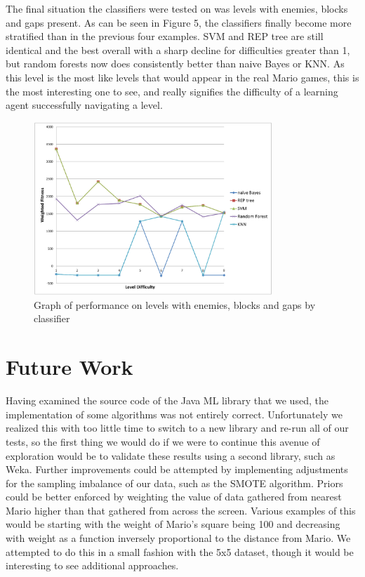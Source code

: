 \documentclass[]{article}   %
\begin{document}
The final situation the classifiers were tested on was levels with enemies, blocks and gaps present. As can be seen in Figure 5, the classifiers finally become 
more stratified than in the previous four examples. SVM and REP tree are still identical and the best overall with a sharp decline for difficulties greater than 1, but 
random forests now does consistently better than naive Bayes or KNN. As this level is the most like levels that would appear in the real Mario games, this is the most
interesting one to see, and really signifies the difficulty of a learning agent successfully navigating a level.
\begin{figure}[H]
\centering
\includegraphics[width=90mm]{enemiesblocksgaps.png}
\caption{Graph of performance on levels with enemies, blocks and gaps by classifier}
\end{figure}

\section{Future Work}

Having examined the source code of the Java ML library that we used, the implementation of some algorithms was not entirely correct. Unfortunately we realized this with too
little time to switch to a new library and re-run all of our tests, so the first thing we would do if we were to continue this avenue of exploration would be to validate
these results using a second library, such as Weka.
\newline\newline
Further improvements could be attempted by implementing adjustments for the sampling imbalance of our data, such as the SMOTE algorithm.
\newline\newline
Priors could be better enforced by weighting the value of data gathered from nearest Mario higher than that gathered from across the screen. Various examples of this would be
starting with the weight of Mario's square being 100 and decreasing with weight as a function inversely proportional to the distance from Mario. We attempted to do this in a
small fashion with the 5x5 dataset, though it would be interesting to see additional approaches.
\end{document}
